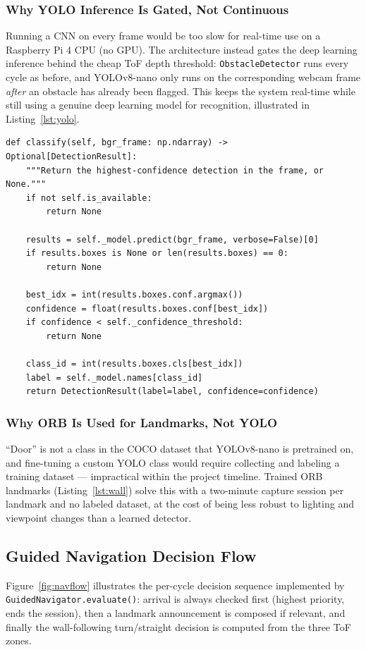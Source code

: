 \documentclass[12pt,a4paper]{article}
\begin{document}
\subsubsection{Why YOLO Inference Is Gated, Not Continuous}
Running a CNN on every frame would be too slow for real-time use on a Raspberry Pi 4 CPU (no GPU). The architecture instead gates the deep learning inference behind the cheap ToF depth threshold: \texttt{ObstacleDetector} runs every cycle as before, and YOLOv8-nano only runs on the corresponding webcam frame \emph{after} an obstacle has already been flagged. This keeps the system real-time while still using a genuine deep learning model for recognition, illustrated in Listing~\ref{lst:yolo}.

\begin{lstlisting}[caption={Obstacle classification gated behind the cheap depth check (\texttt{perception/object\_detector.py}).}, label={lst:yolo}]
def classify(self, bgr_frame: np.ndarray) -> Optional[DetectionResult]:
    """Return the highest-confidence detection in the frame, or None."""
    if not self.is_available:
        return None

    results = self._model.predict(bgr_frame, verbose=False)[0]
    if results.boxes is None or len(results.boxes) == 0:
        return None

    best_idx = int(results.boxes.conf.argmax())
    confidence = float(results.boxes.conf[best_idx])
    if confidence < self._confidence_threshold:
        return None

    class_id = int(results.boxes.cls[best_idx])
    label = self._model.names[class_id]
    return DetectionResult(label=label, confidence=confidence)
\end{lstlisting}

\subsubsection{Why ORB Is Used for Landmarks, Not YOLO}
``Door'' is not a class in the COCO dataset that YOLOv8-nano is pretrained on, and fine-tuning a custom YOLO class would require collecting and labeling a training dataset — impractical within the project timeline. Trained ORB landmarks (Listing~\ref{lst:wall}) solve this with a two-minute capture session per landmark and no labeled dataset, at the cost of being less robust to lighting and viewpoint changes than a learned detector.

\subsection{Guided Navigation Decision Flow}
Figure~\ref{fig:navflow} illustrates the per-cycle decision sequence implemented by \texttt{GuidedNavigator.evaluate()}: arrival is always checked first (highest priority, ends the session), then a landmark announcement is composed if relevant, and finally the wall-following turn/straight decision is computed from the three ToF zones.
\end{document}
